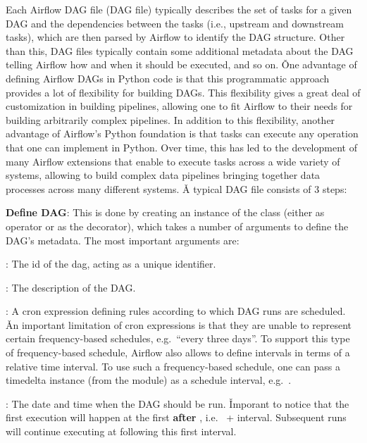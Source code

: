 Each Airflow DAG file (DAG file) typically describes the set of tasks for a given DAG and the dependencies between
the tasks (i.e., upstream and downstream tasks), which are then parsed by Airflow to identify the DAG structure.
Other than this, DAG files typically contain some additional metadata about the DAG telling Airflow how and when it
should be executed, and so on. \v

One advantage of defining Airflow DAGs in Python code is that this programmatic approach provides a lot of
flexibility for building DAGs. This flexibility gives a great deal of customization in building pipelines, allowing
one to fit Airflow to their needs for building arbitrarily complex pipelines. In addition to this flexibility,
another advantage of Airflow's Python foundation is that tasks can execute any operation that one can implement in
Python. Over time, this has led to the development of many Airflow extensions that enable to execute tasks across a
wide variety of systems, allowing to build complex data pipelines bringing together data processes across many
different systems. \v

A typical DAG file consists of 3 steps:
\ben
\item \textbf{Define DAG}: This is done by creating an instance of the  class (either as operator or as the
 decorator), which takes a number of arguments to define the DAG's metadata. The most important arguments
are:
\bit
\item {}: The id of the dag, acting as a unique identifier.
\item {}: The description of the DAG\@.
\item {}: A cron expression defining rules according to which DAG runs are scheduled. \v

An important limitation of cron expressions is that they are unable to represent certain frequency-based schedules,
e.g.\ ``every three days''. To support this type of frequency-based schedule, Airflow also allows to define intervals
in terms of a relative time interval. To use such a frequency-based schedule, one can pass a timedelta instance (from
the  module) as a schedule interval, e.g.\ .

\item {}: The date and time when the DAG should be run. \v

Imporant to notice that the first
execution will happen at the first  \textbf{after} , i.e.\  +
 interval. Subsequent runs will continue executing at  following this first interval.

